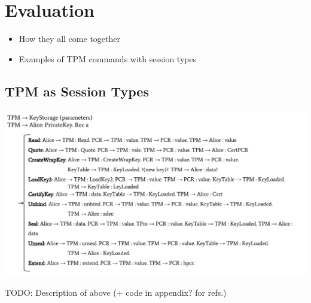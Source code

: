 \section{Evaluation}
\begin{itemize}
  \item How they all come together
  \item Examples of TPM commands with session types
\end{itemize}

\subsection{TPM as Session Types}
\begin{center}
\includegraphics[width=1.2\textwidth, angle=0]{Graphics/Global_Types.pdf}
\end{center}

TODO: Description of above (+ code in appendix? for refs.)